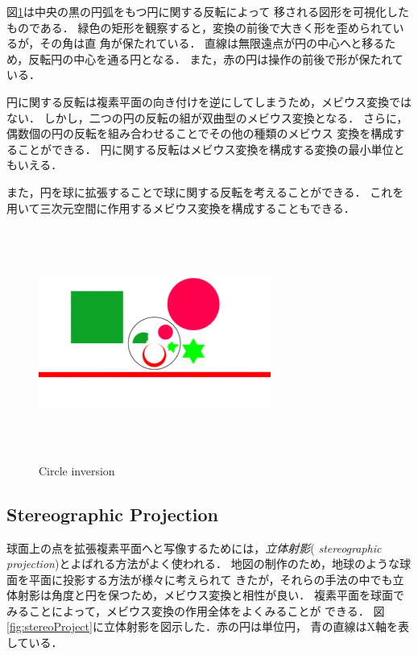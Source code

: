 図\ref{fig:circleInversion}は中央の黒の円弧をもつ円に関する反転によって
移される図形を可視化したものである．
緑色の矩形を観察すると，変換の前後で大きく形を歪められているが，その角は直
角が保たれている．
直線は無限遠点が円の中心へと移るため，反転円の中心を通る円となる．
また，赤の円は操作の前後で形が保たれている．

円に関する反転は複素平面の向き付けを逆にしてしまうため，メビウス変換では
ない．
しかし，二つの円の反転の組が双曲型のメビウス変換となる．
さらに，偶数個の円の反転を組み合わせることでその他の種類のメビウス
変換を構成することができる．
円に関する反転はメビウス変換を構成する変換の最小単位ともいえる．

また，円を球に拡張することで球に関する反転を考えることができる．
これを用いて三次元空間に作用するメビウス変換を構成することもできる．

\begin{figure}[htbp]
 \center
 \includegraphics[width=3in, height=3in, keepaspectratio]{../img/klein/circleInversion.pdf}
 \caption{Circle inversion}
 \label{fig:circleInversion}
\end{figure}

\subsection{Stereographic Projection}

球面上の点を拡張複素平面へと写像するためには，\emph{立体射影}({\it
stereographic projection})とよばれる方法がよく使われる．
地図の制作のため，地球のような球面を平面に投影する方法が様々に考えられて
きたが，それらの手法の中でも立体射影は角度と円を保つため，メビウス変換と相性が良い．
複素平面を球面でみることによって，メビウス変換の作用全体をよくみることが
できる．
図\ref{fig:stereoProject}に立体射影を図示した．赤の円は単位円，
青の直線はX軸を表している．

